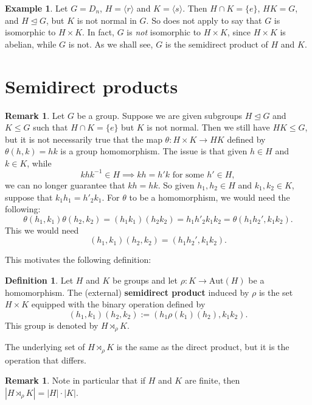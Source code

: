 \documentclass[12pt]{report}
\numberwithin{equation}{section}
\numberwithin{theorem}{chapter}
\theoremstyle{definition}
\newtheorem{definition}[theorem]{Definition}
\newtheorem{example}[theorem]{Example}
\newtheorem*{basic properties}{Basic Properties}
\newtheorem*{Important Remark}{Important Remark}
\newtheorem{remark}[theorem]{Remark}
\newcommand{\df}[1]{{\bf #1}\index{#1}}
\def\sdp{\rtimes}
\begin{document}
\begin{example}\label{D_n not a direct product}
Let $G = D_{n}$, $H = \langle r \rangle$ and $K = \langle s \rangle$. Then $H \cap K = \{e \}$, $HK = G$, and $H \trianglelefteq G$, but $K$ is not normal in $G$.
So  does not apply to say that $G$ is isomorphic to $H \times K$. In fact, $G$ is \emph{not} isomorphic to $H \times K$, since $H \times K$ is abelian, while $G$ is not. As we shall see, $G$ is the semidirect product of $H$ and $K$. 	
\end{example}



\section{Semidirect products}

\begin{remark}
Let $G$ be a group. Suppose we are given subgroups $H\trianglelefteq G$ and $K\leq G$ such that $H\cap K=\{e\}$ but $K$ is not normal. Then we still have $HK \leq G$, but it is not necessarily true that the map $\theta: H \times K \to HK$ defined by $\theta(h,k) = hk$ is a group homomorphism. The issue is that given $h \in H$ and $k \in K$, while
$$khk^{-1} \in H \implies kh = h'k \textrm{ for some } h' \in H,$$
we can no longer guarantee that $kh=hk$. 
So given $h_1, h_2 \in H$ and $k_1, k_2 \in K$, suppose that $k_1h_1 = h'_2k_1$.
For $\theta$ to be a homomorphism, we would need the following:
$$\theta(h_1, k_1) \theta(h_2, k_2) = (h_1k_1)(h_2k_2) = h_1h'_2k_1k_2=\theta(h_1h_2',k_1k_2).$$
This we would need  
$$(h_1, k_1)(h_2, k_2)=(h_1h_2',k_1k_2).$$
\end{remark}

This motivates the following definition:


\begin{definition}
 Let $H$ and $K$ be groups and let $\rho\!: K \to \mathrm{Aut}(H)$ be a homomorphism. The (external) \df{semidirect product} induced by $\rho$ is the set $H \times K$ equipped with the binary operation defined by 
 $$(h_1,k_1)(h_2,k_2) := (h_1\rho(k_1)(h_2),k_1k_2).$$
 This group is denoted by $H \sdp_\rho K$.
 \end{definition}
 
The underlying set of $H \sdp_\rho K$ is the same as the direct product, but it is the operation that differs.
 
\begin{remark}
Note in particular that if $H$ and $K$ are finite, then $|H \sdp_\rho K| = |H| \cdot |K|$.
\end{remark}
 
\end{document}
